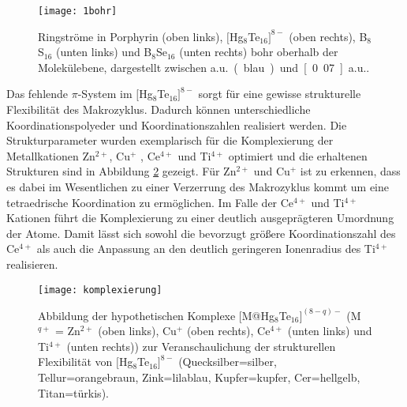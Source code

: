  

\begin{figure}[ht!]
	\centering
	\texttt{[image: 1bohr]}
	\captionsetup{figurewithin = chapter}
	\captionsetup{font=small, labelfont=bf}\caption[{Ringströme in Porphyrin, $[$Hg$_8$Te$_{16}]^{8-}$, B$_8$S$_{16}$ und B$_8$Se$_{16}$}]{Ringströme in Porphyrin (oben links), $[$Hg$_8$Te$_{16}]^{8-}$ (oben rechts), B$_8$S$_{16}$ (unten links) und B$_8$Se$_{16}$ (unten rechts) \unit[1]{bohr} oberhalb der Molekülebene, dargestellt zwischen \unit[0]{a.u.} (blau) und \unit[0.07]{a.u.}.}
\label{abb:lic}
\end{figure}

\FloatBarrier
Das fehlende $\pi$-System im $[$Hg$_8$Te$_{16}]^{8-}$ sorgt für eine gewisse strukturelle Flexibilität des Makrozyklus. Dadurch können unterschiedliche Koordinationspolyeder und Koordinationszahlen realisiert werden. Die Strukturparameter wurden exemplarisch für die Komplexierung der Metallkationen Zn$^{2+}$, Cu$^+$ , Ce$^{4+}$ und Ti$^{4+}$ optimiert und die erhaltenen Strukturen sind in Abbildung \ref{abb:komplexierung} gezeigt. Für Zn$^{2+}$ und Cu$^+$ ist zu erkennen, dass es dabei im Wesentlichen zu einer Verzerrung des Makrozyklus kommt um eine tetraedrische Koordination zu ermöglichen. Im Falle der Ce$^{4+}$ und Ti$^{4+}$ Kationen führt die Komplexierung zu einer deutlich ausgeprägteren Umordnung der Atome. Damit lässt sich sowohl die bevorzugt größere Koordinationszahl des Ce$^{4+}$ als auch die Anpassung an den deutlich geringeren Ionenradius des Ti$^{4+}$ realisieren.

\begin{figure}[ht!]
	\centering
	\texttt{[image: komplexierung]}
	\captionsetup{figurewithin = chapter}
	\captionsetup{font=small, labelfont=bf}\caption[{Abbildungen der hypothetischen Komplexe [M@Hg$_8$Te$_{16}]^{(8-q)-}$ (M$^{q+}$ = Zn$^{2+}$, Cu$^+$ , Ce$^{4+}$ und Ti$^{4+}$)}]{{Abbildung der hypothetischen Komplexe [M@Hg$_8$Te$_{16}]^{(8-q)-}$ (M$^{q+}$ = Zn$^{2+}$ (oben links), Cu$^+$ (oben rechts), Ce$^{4+}$ (unten links) und Ti$^{4+}$ (unten rechts))} zur Veranschaulichung der strukturellen Flexibilität von $[$Hg$_8$Te$_{16}]^{8-}$ (Quecksilber=silber, Tellur=orangebraun, Zink=lilablau, Kupfer=kupfer, Cer=hellgelb, Titan=türkis). }
\label{abb:komplexierung}
\end{figure}


